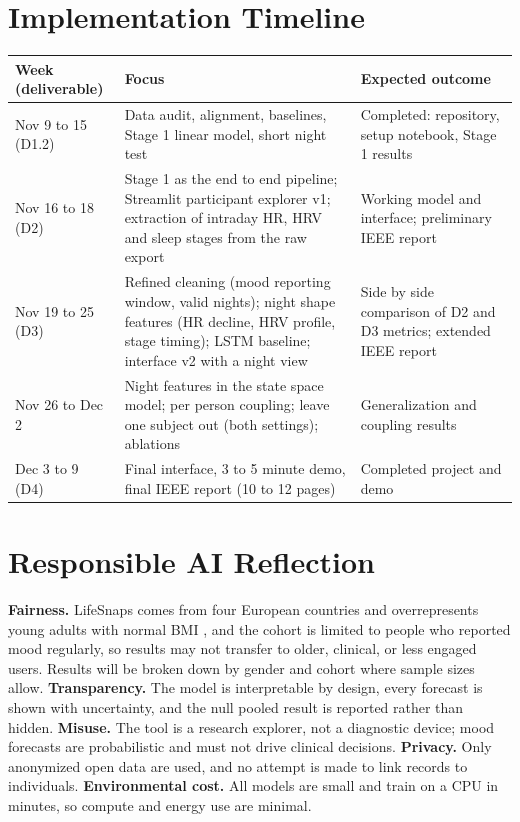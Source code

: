\documentclass[11pt]{article}
\begin{document}
\section{Implementation Timeline}
\begin{center}\small
\begin{tabularx}{\linewidth}{@{}p{2.3cm}Xp{4.6cm}@{}}
\toprule
Week (deliverable) & Focus & Expected outcome \\ \midrule
Nov 9 to 15 (D1.2) & Data audit, alignment, baselines, Stage 1 linear model, short night test & Completed: repository, setup notebook, Stage 1 results \\
Nov 16 to 18 (D2) & Stage 1 as the end to end pipeline; Streamlit participant explorer v1; extraction of intraday HR, HRV and sleep stages from the raw export & Working model and interface; preliminary IEEE report \\
Nov 19 to 25 (D3) & Refined cleaning (mood reporting window, valid nights); night shape features (HR decline, HRV profile, stage timing); LSTM baseline; interface v2 with a night view & Side by side comparison of D2 and D3 metrics; extended IEEE report \\
Nov 26 to Dec 2 & Night features in the state space model; per person coupling; leave one subject out (both settings); ablations & Generalization and coupling results \\
Dec 3 to 9 (D4) & Final interface, 3 to 5 minute demo, final IEEE report (10 to 12 pages) & Completed project and demo \\
\bottomrule
\end{tabularx}
\end{center}

\section{Responsible AI Reflection}
\textbf{Fairness.} LifeSnaps comes from four European countries and overrepresents young adults with normal BMI \cite{bias}, and the cohort is limited to people who reported mood regularly, so results may not transfer to older, clinical, or less engaged users. Results will be broken down by gender and cohort where sample sizes allow. \textbf{Transparency.} The model is interpretable by design, every forecast is shown with uncertainty, and the null pooled result is reported rather than hidden. \textbf{Misuse.} The tool is a research explorer, not a diagnostic device; mood forecasts are probabilistic and must not drive clinical decisions. \textbf{Privacy.} Only anonymized open data are used, and no attempt is made to link records to individuals. \textbf{Environmental cost.} All models are small and train on a CPU in minutes, so compute and energy use are minimal.
\end{document}
